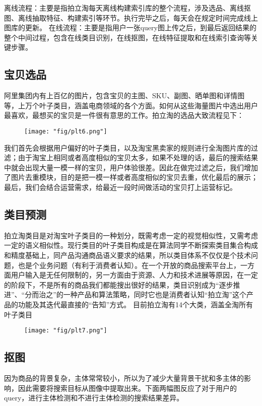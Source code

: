 离线流程：主要是指拍立淘每天离线构建索引库的整个流程，涉及选品、离线抠图、离线抽取特征、构建索引等环节。执行完毕之后，每天会在规定时间完成线上图库的更新。
在线流程：主要是指用户一张query图上传之后，到最后返回结果的整个中间过程，包含在线类目识别，在线抠图，在线特征提取和在线索引查询等关键步骤。
	
\subsection{宝贝选品}
阿里集团内有上百亿的图片，包含宝贝的主图、SKU、副图、晒单图和详情图等，上万个叶子类目，涵盖电商领域的各个方面。如何从这些海量图片中选出用户最喜欢，最想买的宝贝是一件很有意思的工作。拍立淘的选品大致流程见下：

\begin{figure}[!h]
	\centering
	\texttt{[image: "fig/plt6.png"]}
	\caption{}
	\label{fig:plt6}
\end{figure}

我们首先会根据用户偏好的叶子类目，以及淘宝黑卖家的规则进行全淘图片库的过滤；由于淘宝上相同或者高度相似的宝贝太多，如果不处理的话，最后的搜索结果中就会出现大量一模一样的宝贝，用户体验很差。因此在做完过滤之后，我们增加了图片去重模块，目的是把一模一样或者高度相似的宝贝去重，优化最后的展示；最后，我们会结合运营需求，给最近一段时间做活动的宝贝打上运营标记。

\subsection{类目预测}
拍立淘类目是对淘宝叶子类目的一种划分，既需考虑一定的视觉相似性，又需考虑一定的语义相似性。现行类目的叶子类目构成是在算法同学不断探索类目集合构成和精度基础上，同产品沟通商品语义要求的结果，所以类目体系不仅仅是个技术问题，也是个业务问题（有利于消费者认知）。在一个开放的商品搜索平台上，一方面用户输入是无任何限制的，另一方面由于资源、人力和技术进展等原因，在一定的阶段下，不是所有的商品我们都能搜出很好的结果，类目识别成为“逐步推进”、“分而治之”的一种产品和算法策略，同时它也是消费者认知“拍立淘”这个产品的功能及其迭代最直接的“告知”方式。
目前拍立淘有14个大类，涵盖全淘所有叶子类目

\begin{figure}[!h]
	\centering
	\texttt{[image: "fig/plt7.png"]}
	\caption{}
	\label{fig:plt7}
\end{figure}

\subsection{抠图}
因为商品的背景复杂，主体常常较小，所以为了减少大量背景干扰和多主体的影响，因此需要将搜索目标从图像中提取出来。下面两幅图反应了对于用户的query，进行主体检测和不进行主体检测的搜索结果差异。

